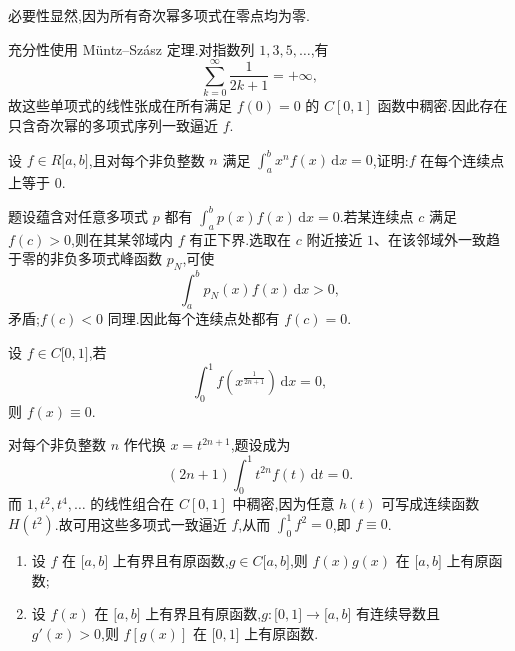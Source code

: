 \begin{solution}
    必要性显然,因为所有奇次幂多项式在零点均为零.

    充分性使用 M\"untz--Sz\'asz 定理.对指数列 $1,3,5,\ldots$,有
    \[
        \sum\limits_{k=0}^{\infty}\dfrac{1}{2k+1}=+\infty,
    \]
    故这些单项式的线性张成在所有满足 $f(0)=0$ 的 $C[0,1]$ 函数中稠密.因此存在只含奇次幂的多项式序列一致逼近 $f$.
\end{solution}

\begin{example}
    设 $f\in R\lbrack a,b\rbrack$,且对每个非负整数 $n$ 满足 $\displaystyle\int_a^bx^nf(x)\,\mathrm{d}x=0$,证明:$f$ 在每个连续点上等于 $0$.
\end{example}
\exampleblank

\begin{solution}
    题设蕴含对任意多项式 $p$ 都有 $\int_a^bp(x)f(x)\,\mathrm{d}x=0$.若某连续点 $c$ 满足 $f(c)>0$,则在其某邻域内 $f$ 有正下界.选取在 $c$ 附近接近 $1$、在该邻域外一致趋于零的非负多项式峰函数 $p_N$,可使
    \[
        \int_a^bp_N(x)f(x)\,\mathrm{d}x>0,
    \]
    矛盾;$f(c)<0$ 同理.因此每个连续点处都有 $f(c)=0$.
\end{solution}

\begin{example}
    设 $f\in C\lbrack 0,1\rbrack$,若
    \[
        \int_0^1f\left(x^{\frac{1}{2n+1}}\right)\,\mathrm{d}x=0,
    \]
    则 $f(x)\equiv0$.
\end{example}
\exampleblank

\begin{solution}
    对每个非负整数 $n$ 作代换 $x=t^{2n+1}$,题设成为
    \[
        (2n+1)\int_0^1t^{2n}f(t)\,\mathrm{d}t=0.
    \]
    而 $1,t^2,t^4,\ldots$ 的线性组合在 $C[0,1]$ 中稠密,因为任意
    $h(t)$ 可写成连续函数 $H(t^2)$.故可用这些多项式一致逼近 $f$,从而
    $\int_0^1f^2=0$,即 $f\equiv0$.
\end{solution}

\begin{example}
    \begin{enumerate}
        \item 设 $f$ 在 $\lbrack a,b\rbrack$ 上有界且有原函数,$g\in C\lbrack a,b\rbrack$,则 $f(x)g(x)$ 在 $\lbrack a,b\rbrack$ 上有原函数;
        \item 设 $f(x)$ 在 $\lbrack a,b\rbrack$ 上有界且有原函数,$g:\lbrack 0,1\rbrack\to\lbrack a,b\rbrack$ 有连续导数且 $g'(x)>0$,则 $f[g(x)]$ 在 $\lbrack 0,1\rbrack$ 上有原函数.
    \end{enumerate}
\end{example}
\exampleblank


